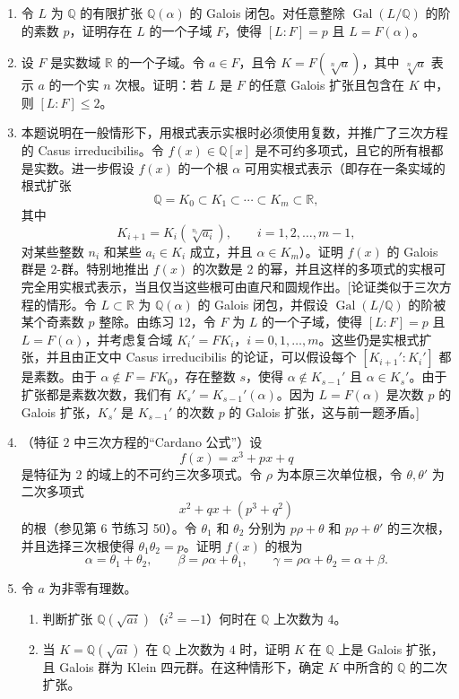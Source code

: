 \begin{enumerate}[label=\arabic*.]
\item 令 $L$ 为 $\mathbb Q$ 的有限扩张 $\mathbb Q(\alpha)$ 的 Galois 闭包。对任意整除 $\operatorname{Gal}(L/\mathbb Q)$ 的阶的素数 $p$，证明存在 $L$ 的一个子域 $F$，使得 $[L:F]=p$ 且 $L=F(\alpha)$。

\item 设 $F$ 是实数域 $\mathbb R$ 的一个子域。令 $a\in F$，且令 $K=F(\sqrt[n]{a})$，其中 $\sqrt[n]{a}$ 表示 $a$ 的一个实 $n$ 次根。证明：若 $L$ 是 $F$ 的任意 Galois 扩张且包含在 $K$ 中，则 $[L:F]\leq2$。

\item 本题说明在一般情形下，用根式表示实根时必须使用复数，并推广了三次方程的 Casus irreducibilis。令 $f(x)\in\mathbb Q[x]$ 是不可约多项式，且它的所有根都是实数。进一步假设 $f(x)$ 的一个根 $\alpha$ 可用实根式表示（即存在一条实域的根式扩张
\[
\mathbb Q=K_0\subset K_1\subset\cdots\subset K_m\subset\mathbb R,
\]
其中
\[
K_{i+1}=K_i(\sqrt[n_i]{a_i}),
\qquad i=1,2,\ldots,m-1,
\]
对某些整数 $n_i$ 和某些 $a_i\in K_i$ 成立，并且 $\alpha\in K_m$）。证明 $f(x)$ 的 Galois 群是 $2$-群。特别地推出 $f(x)$ 的次数是 $2$ 的幂，并且这样的多项式的实根可完全用实根式表示，当且仅当这些根可由直尺和圆规作出。[论证类似于三次方程的情形。令 $L\subset\mathbb R$ 为 $\mathbb Q(\alpha)$ 的 Galois 闭包，并假设 $\operatorname{Gal}(L/\mathbb Q)$ 的阶被某个奇素数 $p$ 整除。由练习 12，令 $F$ 为 $L$ 的一个子域，使得 $[L:F]=p$ 且 $L=F(\alpha)$，并考虑复合域 $K_i'=FK_i$，$i=0,1,\ldots,m$。这些仍是实根式扩张，并且由正文中 Casus irreducibilis 的论证，可以假设每个 $[K_{i+1}':K_i']$ 都是素数。由于 $\alpha\notin F=FK_0$，存在整数 $s$，使得 $\alpha\notin K_{s-1}'$ 且 $\alpha\in K_s'$。由于扩张都是素数次数，我们有 $K_s'=K_{s-1}'(\alpha)$。因为 $L=F(\alpha)$ 是次数 $p$ 的 Galois 扩张，$K_s'$ 是 $K_{s-1}'$ 的次数 $p$ 的 Galois 扩张，这与前一题矛盾。]

\item （特征 $2$ 中三次方程的“Cardano 公式”）设
\[
f(x)=x^3+px+q
\]
是特征为 $2$ 的域上的不可约三次多项式。令 $\rho$ 为本原三次单位根，令 $\theta,\theta'$ 为二次多项式
\[
x^2+qx+(p^3+q^2)
\]
的根（参见第 6 节练习 50）。令 $\theta_1$ 和 $\theta_2$ 分别为 $p\rho+\theta$ 和 $p\rho+\theta'$ 的三次根，并且选择三次根使得 $\theta_1\theta_2=p$。证明 $f(x)$ 的根为
\[
\alpha=\theta_1+\theta_2,
\qquad
\beta=\rho\alpha+\theta_1,
\qquad
\gamma=\rho\alpha+\theta_2=\alpha+\beta.
\]

\item 令 $a$ 为非零有理数。
\begin{enumerate}[label=(\alph*)]
\item 判断扩张 $\mathbb Q(\sqrt{ai})$（$i^2=-1$）何时在 $\mathbb Q$ 上次数为 $4$。
\item 当 $K=\mathbb Q(\sqrt{ai})$ 在 $\mathbb Q$ 上次数为 $4$ 时，证明 $K$ 在 $\mathbb Q$ 上是 Galois 扩张，且 Galois 群为 Klein 四元群。在这种情形下，确定 $K$ 中所含的 $\mathbb Q$ 的二次扩张。
\end{enumerate}


\end{enumerate}
